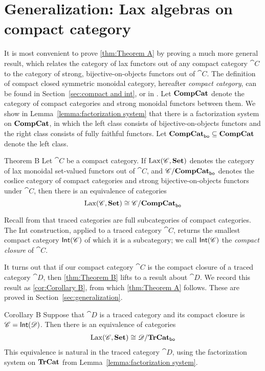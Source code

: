 \documentclass[12pt,oneside,article,draft]{memoir}
\begin{document}
\section{Generalization: Lax algebras on compact category}

It is most convenient to prove \ref{thm:Theorem A} by proving a much more general result, which relates the category of lax functors out of any compact category $\cat{C}$ to the category of strong, bijective-on-objects functors out of $\cat{C}$. The definition of compact closed symmetric monoidal category, hereafter \emph{compact category}, can be found in Section~\ref{sec:compact and int}, or in \cite{}. Let $\mathbf{CompCat}$ denote the category of compact categories and strong monoidal functors between them. We show in Lemma~\ref{lemma:factorization system} that there is a factorization system on $\mathbf{CompCat}$, in which the left class consists of bijective-on-objects functors and the right class consists of fully faithful functors. Let $\mathbf{CompCat}_{\mathsf{bo}}\subseteq\mathbf{CompCat}$ denote the left class. 

\begin{named}{Theorem B}\label{thm:Theorem B}
 Let $\cat{C}$ be a compact category. If $\operatorname{Lax}(\mathscr{C},\mathbf{Set})$ denotes the category of lax monoidal set-valued functors out of $\cat{C}$, and $\mathscr{C}/\mathbf{CompCat}_{\mathsf{bo}}$ denotes the coslice category of compact categories and strong bijective-on-objects functors under $\cat{C}$, then there is an equivalence of categories
\begin{equation}\label{dia:compact lax strong}
  \operatorname{Lax}(\mathscr{C},\mathbf{Set})\cong\mathscr{C}/\mathbf{CompCat}_{\mathsf{bo}}
\end{equation}
\end{named}


Recall from \cite{JoyalStreetVerity} that traced categories are full subcategories of compact categories. The Int construction, applied to a traced category $\cat{C}$, returns the smallest compact category $\mathsf{Int}(\mathscr{C})$ of which it is a subcategory; we call $\mathsf{Int}(\mathscr{C})$ the \emph{compact closure} of $\cat{C}$. 

It turns out that if our compact category $\cat{C}$ is the compact closure of a traced category $\cat{D}$, then \ref{thm:Theorem B} lifts to a result about $\cat{D}$. We record this result as \ref{cor:Corollary B}, from which \ref{thm:Theorem A} follows. These are proved in Section~\ref{sec:generalization}. 

\begin{named}{Corollary B}\label{cor:Corollary B}
Suppose that $\cat{D}$ is a traced category and its compact closure is $\mathscr{C}=\mathsf{Int}(\mathscr{D})$. Then there is an equivalence of categories
\begin{align}\label{dia:traced lax strong}
\operatorname{Lax}(\mathscr{C},\mathbf{Set})\cong\mathscr{D}/\mathbf{TrCat}_{\mathsf{bo}}
\end{align}
This equivalence is natural in the traced category $\cat{D}$, using the factorization system on $\mathbf{TrCat}$ from Lemma~\ref{lemma:factorization system}.
\end{named}
\end{document}
